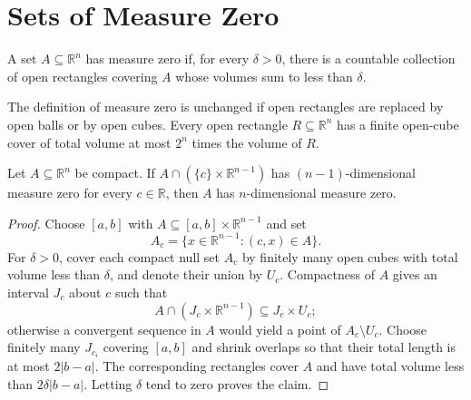 

\section{Sets of Measure Zero}

\begin{definition}
\label{def:6-38-extra-1}



A set $A \subseteq \mathbb{R}^n$ has measure zero if, for every $\delta>0$, there is a countable collection of open rectangles covering $A$ whose volumes sum to less than $\delta$.
\end{definition}

\begin{lemma}
\label{exer:6-1}



The definition of measure zero is unchanged if open rectangles are replaced
by open balls or by open cubes. Every open rectangle
$R\subseteq\mathbb R^n$ has a finite open-cube cover of total volume at most
$2^n$ times the volume of $R$.
\end{lemma}

\begin{lemma}
\label{lem:6-2}





Let $A \subseteq \mathbb{R}^n$ be compact. If
$A \cap (\{c\}\times\mathbb{R}^{n-1})$ has $(n-1)$-dimensional measure zero for every $c\in\mathbb{R}$, then $A$ has $n$-dimensional measure zero.
\end{lemma}

\begin{proof}

\sketch Choose $[a,b]$ with $A\subseteq [a,b]\times\mathbb{R}^{n-1}$ and set
\[
A_c=\{x\in\mathbb{R}^{n-1}:(c,x)\in A\}.
\]
For $\delta>0$, cover each compact null set $A_c$ by finitely many open cubes with total volume less than $\delta$, and denote their union by $U_c$. Compactness of $A$ gives an interval $J_c$ about $c$ such that
\[
A\cap(J_c\times\mathbb{R}^{n-1})\subseteq J_c\times U_c;
\]
otherwise a convergent sequence in $A$ would yield a point of $A_c\setminus U_c$. Choose finitely many $J_{c_i}$ covering $[a,b]$ and shrink overlaps so that their total length is at most $2|b-a|$. The corresponding rectangles cover $A$ and have total volume less than $2\delta|b-a|$. Letting $\delta$ tend to zero proves the claim.
\end{proof}

